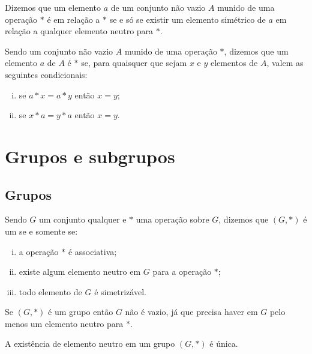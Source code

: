 \begin{Nom}\label{nomsimetrizavel}
  Dizemos que um elemento $a$ de um conjunto não vazio
  $A$ munido de uma operação
  $\ast$ é  em relação a
  $\ast$ se e só se
  existir
  um elemento simétrico de $a$ em relação a qualquer elemento neutro
  para $\ast$.
\end{Nom}

\begin{Nom}
  Sendo um conjunto não vazio
  $A$ munido de uma operação $\ast$, dizemos que um
  elemento $a$ de $A$ é  $\ast$ se, para
  quaisquer que
  sejam $x$ e $y$ elementos de $A$, valem as seguintes condicionais:
  \begin{enumerate}[(i)]
    \item se $a\ast x = a\ast y$ então $x=y$;
    \item se $x\ast a = y\ast a$ então $x=y$.
  \end{enumerate}
\end{Nom}

\section{Grupos e subgrupos}

\subsection{Grupos}

\begin{Def}
  Sendo $G$ um conjunto qualquer e $\ast$ uma operação sobre $G$, dizemos
  que $(G,\ast)$ é um  se e somente se:
  \begin{enumerate}[(i)]
    \item a operação $\ast$ é associativa;
    \item existe algum elemento neutro em $G$ para a operação
      $\ast$;
    \item todo elemento de $G$ é simetrizável.
  \end{enumerate}
\end{Def}

\begin{Obs}
  Se $(G,\ast)$ é um grupo então $G$ não é vazio, já que precisa haver
  em $G$ pelo menos um elemento neutro para $\ast$.
\end{Obs}

\begin{Propr}\label{proprunicoe}
  A existência de elemento neutro em um grupo $(G,\ast)$ é única.
\end{Propr}

